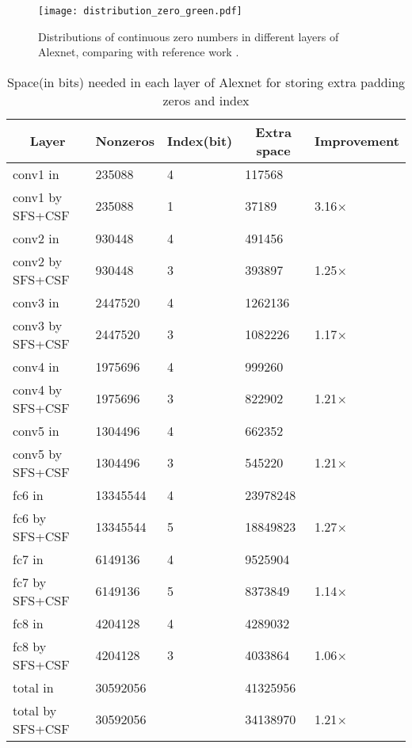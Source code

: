 \documentclass{article} %
\begin{document}
\begin{figure}[h]
\begin{center}
\texttt{[image: distribution\_zero\_green.pdf]}
\end{center}
\caption{Distributions of continuous zero numbers in different layers of Alexnet, comparing with reference work \citep{han2015deep_compression}.}
\label{zero-distribution}
\end{figure}

\begin{table}[hp]\footnotesize
\caption{Space(in bits) needed in each layer of Alexnet for storing extra padding zeros and index}
\label{extra-space-table}
\begin{center}
\begin{tabular}{lllll}
\multicolumn{1}{c}{\bf Layer}  &\multicolumn{1}{c}{\bf Nonzeros} &\multicolumn{1}{c}{\bf Index(bit)} &\multicolumn{1}{c}{\bf Extra space} &\multicolumn{1}{c}{\bf Improvement}\\
\hline
conv1 in \citep{han2015deep_compression} &235088 &4 &117568 & \\
conv1 by SFS+CSF &235088 &1 &37189 &3.16$\times$\\
conv2 in \citep{han2015deep_compression} &930448 &4 &491456 & \\
conv2 by SFS+CSF &930448 &3 &393897 &1.25$\times$ \\
conv3 in \citep{han2015deep_compression} &2447520 &4 &1262136 & \\
conv3 by SFS+CSF &2447520 &3 &1082226 &1.17$\times$ \\
conv4 in \citep{han2015deep_compression} &1975696 &4 &999260 & \\
conv4 by SFS+CSF &1975696 &3 &822902 &1.21$\times$\\
conv5 in \citep{han2015deep_compression} &1304496 &4 &662352 & \\
conv5 by SFS+CSF &1304496 &3 &545220 &1.21$\times$\\
\hline
fc6 in \citep{han2015deep_compression} &13345544 &4 &23978248\\
fc6 by SFS+CSF &13345544 &5 &18849823 &1.27$\times$\\
fc7 in \citep{han2015deep_compression} &6149136 &4 &9525904 & \\
fc7 by SFS+CSF &6149136 &5 &8373849 &1.14$\times$\\
fc8 in \citep{han2015deep_compression} &4204128 &4 &4289032 & \\
fc8 by SFS+CSF &4204128 &3 &4033864 &1.06$\times$\\
\hline
total in \citep{han2015deep_compression} &30592056 & &41325956\\
total by SFS+CSF &30592056 & &34138970 &1.21$\times$\\
\end{tabular}
\end{center}
\end{table}
\end{document}
